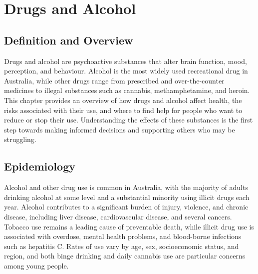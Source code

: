 \chapter{Drugs and Alcohol}

\section*{Definition and Overview}
Drugs and alcohol are psychoactive substances that alter brain function, mood, perception, and behaviour. Alcohol is the most widely used recreational drug in Australia, while other drugs range from prescribed and over-the-counter medicines to illegal substances such as cannabis, methamphetamine, and heroin. This chapter provides an overview of how drugs and alcohol affect health, the risks associated with their use, and where to find help for people who want to reduce or stop their use. Understanding the effects of these substances is the first step towards making informed decisions and supporting others who may be struggling.

\section*{Epidemiology}
Alcohol and other drug use is common in Australia, with the majority of adults drinking alcohol at some level and a substantial minority using illicit drugs each year. Alcohol contributes to a significant burden of injury, violence, and chronic disease, including liver disease, cardiovascular disease, and several cancers. Tobacco use remains a leading cause of preventable death, while illicit drug use is associated with overdose, mental health problems, and blood-borne infections such as hepatitis C. Rates of use vary by age, sex, socioeconomic status, and region, and both binge drinking and daily cannabis use are particular concerns among young people.

